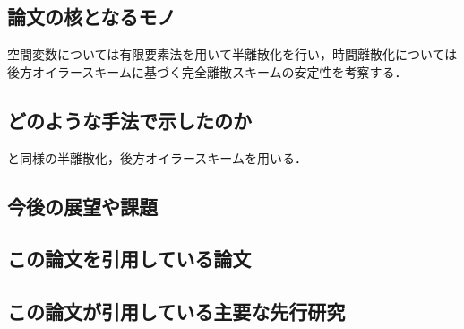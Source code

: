 \documentclass[openary, a4paper, oneside]{jsarticle}
\begin{document}
  \subsection{論文の核となるモノ}
  空間変数については有限要素法を用いて半離散化を行い，時間離散化については後方オイラースキームに基づく完全離散スキームの安定性を考察する．
  \subsection{どのような手法で示したのか}
  \cite{CherfilsPetcuPierre2010}と同様の半離散化，後方オイラースキームを用いる．
  \subsection{今後の展望や課題}
  \subsection{この論文を引用している論文}
  \subsection{この論文が引用している主要な先行研究}

\newpage

\end{document}
